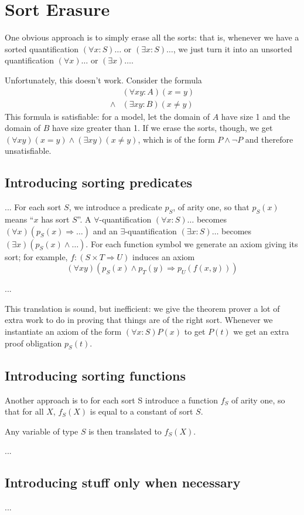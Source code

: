 
\section{Sort Erasure}

One obvious approach is to simply erase all the sorts: that is,
whenever we have a sorted quantification $(\forall x:S)\ldots$ or
$(\exists x:S)\ldots$, we just turn it into an unsorted quantification
$(\forall x)\ldots$ or $(\exists x)\ldots$.

Unfortunately, this doesn't work. Consider the formula
\begin{align*}
& (\forall x y:A)(x = y) \\
\land & (\exists x y:B)(x \neq y)
\end{align*}
This formula is satisfiable: for a model, let the domain of $A$ have
size 1 and the domain of $B$ have size greater than 1. If we erase the
sorts, though, we get $(\forall x y)(x = y) \land (\exists x y)(x \neq
y)$, which is of the form $P \land \neg P$ and therefore
unsatisfiable.

\subsection{Introducing sorting predicates}

... For each sort $S$, we introduce a predicate $p_S$, of arity one,
so that $p_S(x)$ means ``$x$ has sort $S$''. A
$\forall$-quantification $(\forall x:S)\ldots$ becomes $(\forall
x)(p_S(x) \Rightarrow \ldots)$ and an $\exists$-quantification
$(\exists x:S)\ldots$ becomes $(\exists x)(p_S(x) \land \ldots)$. For
each function symbol we generate an axiom giving its sort; for
example, $f : (S \times T \Rightarrow U)$ induces an axiom
\begin{displaymath}
(\forall x y)(p_S(x) \land p_T(y) \Rightarrow p_U(f(x, y)))
\end{displaymath}

...

This translation is sound, but inefficient: we give the theorem prover
a lot of extra work to do in proving that things are of the right
sort. Whenever we instantiate an axiom of the form $(\forall
x:S)P(x)$ to get $P(t)$ we get an extra proof obligation $p_S(t)$.

\subsection{Introducing sorting functions}

Another approach is to for each sort S introduce a function $f_S$ of
arity one, so that for all $X$, $f_S(X)$ is equal to a constant of sort $S$. 

Any variable of type $S$ is then translated to $f_S(X)$.

...

\subsection{Introducing stuff only when necessary}

...
